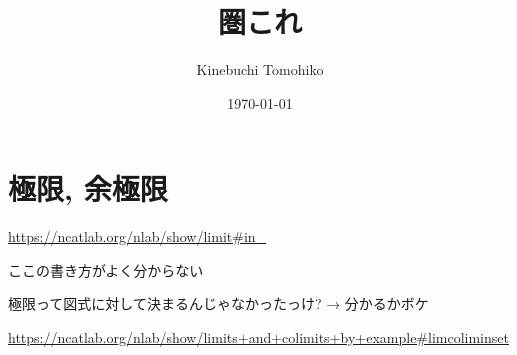 \documentclass{jarticle}
\title{圏これ}
\author{Kinebuchi Tomohiko}
\date{\today}
\begin{document}
\section{極限, 余極限}

\url{https://ncatlab.org/nlab/show/limit#in_}

ここの書き方がよく分からない

極限って図式に対して決まるんじゃなかったっけ?
→ 分かるかボケ

\url{https://ncatlab.org/nlab/show/limits+and+colimits+by+example#limcoliminset}
\end{document}
